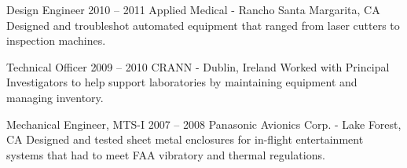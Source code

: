 \WorkEntry
  {Design Engineer}
  {2010 -- 2011}
  {Applied Medical - Rancho Santa Margarita, CA}
  {Designed and troubleshot automated equipment that ranged from laser cutters to inspection machines.}
\sepspace

\WorkEntry
  {Technical Officer}
  {2009 -- 2010}
  {CRANN - Dublin, Ireland}
  {Worked with Principal Investigators to help support laboratories by maintaining equipment and managing inventory.}
\sepspace

\WorkEntry
  {Mechanical Engineer, MTS-I}
  {2007 -- 2008}
  {Panasonic Avionics Corp. - Lake Forest, CA}
  {Designed and tested sheet metal enclosures for in-flight entertainment systems that had to meet FAA vibratory and thermal regulations.}
